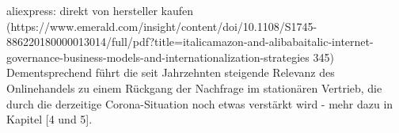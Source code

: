    aliexpress: direkt von hersteller kaufen (https://www.emerald.com/insight/content/doi/10.1108/S1745-886220180000013014/full/pdf?title=italicamazon-and-alibabaitalic-internet-governance-business-models-and-internationalization-strategies 345)
\fi
Dementsprechend führt die seit Jahrzehnten steigende Relevanz des Onlinehandels zu einem Rückgang der Nachfrage im stationären Vertrieb\cite{Shankar}, die durch die derzeitige Corona-Situation noch etwas verstärkt wird - mehr dazu in Kapitel [4 und 5].

